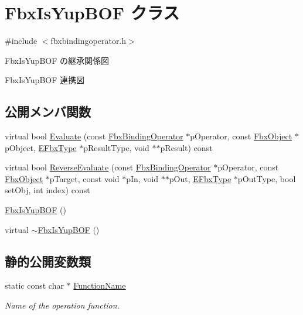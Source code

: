 \hypertarget{class_fbx_is_yup_b_o_f}{}\section{Fbx\+Is\+Yup\+B\+OF クラス}
\label{class_fbx_is_yup_b_o_f}


{\ttfamily \#include $<$fbxbindingoperator.\+h$>$}



Fbx\+Is\+Yup\+B\+OF の継承関係図


Fbx\+Is\+Yup\+B\+OF 連携図
\subsection*{公開メンバ関数}
\begin{DoxyCompactItemize}
\item 
virtual bool \hyperlink{class_fbx_is_yup_b_o_f_a9833ec572b4af6536e46e185f1fad6b9}{Evaluate} (const \hyperlink{class_fbx_binding_operator}{Fbx\+Binding\+Operator} $\ast$p\+Operator, const \hyperlink{class_fbx_object}{Fbx\+Object} $\ast$p\+Object, \hyperlink{fbxpropertytypes_8h_a73913a5ddfb20e57c6f25e9e6784bd92}{E\+Fbx\+Type} $\ast$p\+Result\+Type, void $\ast$$\ast$p\+Result) const
\item 
virtual bool \hyperlink{class_fbx_is_yup_b_o_f_a27c960322c0b7c6a4aec67484fcfcf52}{Reverse\+Evaluate} (const \hyperlink{class_fbx_binding_operator}{Fbx\+Binding\+Operator} $\ast$p\+Operator, const \hyperlink{class_fbx_object}{Fbx\+Object} $\ast$p\+Target, const void $\ast$p\+In, void $\ast$$\ast$p\+Out, \hyperlink{fbxpropertytypes_8h_a73913a5ddfb20e57c6f25e9e6784bd92}{E\+Fbx\+Type} $\ast$p\+Out\+Type, bool set\+Obj, int index) const
\item 
\hyperlink{class_fbx_is_yup_b_o_f_a92123eda1c5d19cc7b55699cd381f06f}{Fbx\+Is\+Yup\+B\+OF} ()
\item 
virtual \hyperlink{class_fbx_is_yup_b_o_f_a4359148e3255a58f4a806fb10de9a259}{$\sim$\+Fbx\+Is\+Yup\+B\+OF} ()
\end{DoxyCompactItemize}
\subsection*{静的公開変数類}
\begin{DoxyCompactItemize}
\item 
static const char $\ast$ \hyperlink{class_fbx_is_yup_b_o_f_a0db8ffbc3f9941561f19ad457493f917}{Function\+Name}
\begin{DoxyCompactList}\small\item\em Name of the operation function. \end{DoxyCompactList}\end{DoxyCompactItemize}


